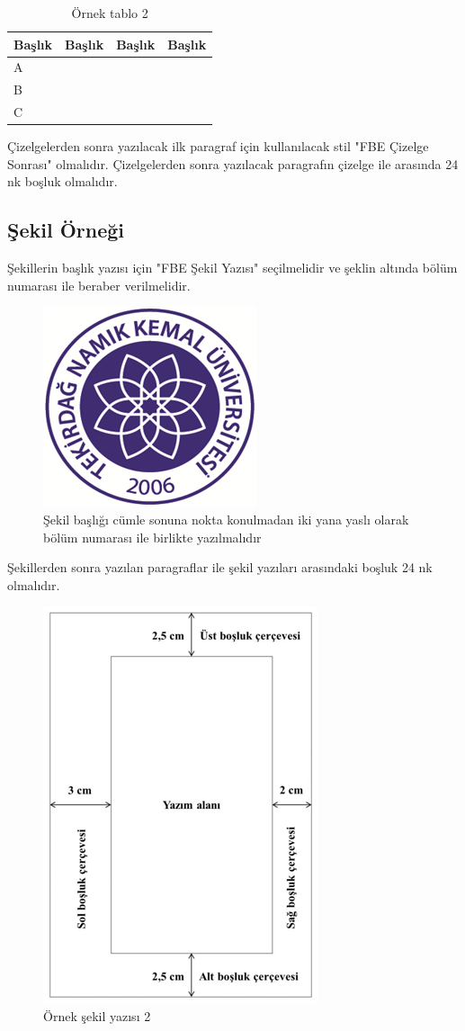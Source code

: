 \begin{table}[!t]
	\caption{Örnek tablo 2}
	\begin{tabular}{L{3cm}L{3cm}L{3cm}L{3cm}}
	\hline
	Başlık&Başlık&Başlık&Başlık\\\hline
	A&&&\\
	B&&&\\
	C&&&\\
	\hline
\end{tabular}
\vspace{24pt}	
\end{table}

	
Çizelgelerden sonra yazılacak ilk paragraf için kullanılacak stil "FBE Çizelge Sonrası" olmalıdır. Çizelgelerden sonra yazılacak paragrafın çizelge ile arasında 24 nk boşluk olmalıdır. 

\subsection{Şekil Örneği}
\noindent Şekillerin başlık yazısı için "FBE Şekil Yazısı" seçilmelidir ve şeklin altında bölüm numarası ile beraber verilmelidir.

\begin{figure}[!h]
	\includegraphics[width=0.2\linewidth]{sekiller/nku_logo}
	\caption{Şekil başlığı cümle sonuna nokta konulmadan iki yana yaslı olarak bölüm numarası ile birlikte yazılmalıdır}
	\label{fig:nkulogo}
	\vspace{24pt}
\end{figure}

Şekillerden sonra yazılan paragraflar ile şekil yazıları arasındaki boşluk 24 nk olmalıdır. 

\begin{figure}
	\includegraphics[width=0.2\linewidth]{sekiller/sekil}
	\caption{Örnek şekil yazısı 2}
	\label{fig:sekil}
	\vspace{24pt}
\end{figure}

